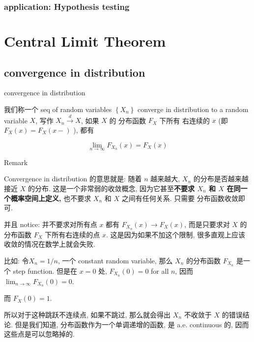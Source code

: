 \documentclass{qlnotes-export}
\begin{document}
\subsection{application: Hypothesis testing}\label{application-hypothesis-testing}

\chapter{Central Limit Theorem}\label{central-limit-theorem}

\section{convergence in distribution}\label{convergence-in-distribution}

\begin{definition}{convergence in distribution}\label{def-05-clt-convergence-in-distribution}

我们称一个 seq of random variables \(\left\{ X_{n} \right\}\) converge in distribution to a random variable \(X\), 写作 \(X_{n}\overset{d}{\rightarrow}X\), 如果 \(X\) 的 分布函数 \(F_{X}\) 下所有 右连续的 \(x\) (即 \(F_{X}(x) = F_{X}(x - )\) ), 都有

\[\lim\limits_{n\rightarrow\infty}F_{X_{n}}(x) = F_{X}(x)\]

\end{definition}

\begin{qlremark}{Remark}

Convergence in distribution 的意思就是: 随着 \(n\) 越来越大, \(X_{n}\) 的分布是否越来越接近 \(X\) 的分布. 这是一个非常弱的收敛概念, 因为它甚至\textbf{不要求 \(X_{n}\) 和 \(X\) 在同一个概率空间上定义,} 也不要求 \(X_{n}\) 和 \(X\) 之间有任何关系. 只需要 分布函数收敛即可.

并且 notice: 并不要求对所有点 \(x\) 都有 \(F_{X_{n}}(x)\rightarrow F_{X}(x)\), 而是只要求对 \(X\) 的分布函数 \(F_{X}\) 下所有右连续的点 \(x\). 这是因为如果不加这个限制, 很多直观上应该收敛的情况在数学上就会失败.

比如: 令\(X_{n} = 1/n\), 一个 constant random variable, 那么 \(X_{n}\) 的分布函数 \(F_{X_{n}}\) 是一个 step function. 但是在 \(x = 0\) 处, \(F_{X_{n}}(0) = 0\) for all \(n\), 因而 \(\lim_{n\rightarrow\infty}F_{X_{n}}(0) = 0\).

而 \(F_{X}(0) = 1\).

所以对于这种跳跃不连续点, 如果不跳过, 那么就会得出 \(X_{n}\) 不收敛于 \(X\) 的错误结论. 但是我们知道, 分布函数作为一个单调递增的函数, 是 a.e. continuous 的, 因而这些点是可以忽略掉的.

\end{qlremark}
\end{document}
